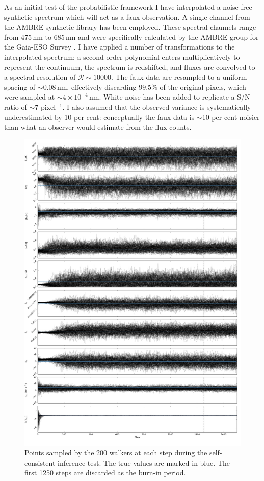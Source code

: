 \documentclass[iop]{emulateapj}
\begin{document}
As an initial test of the probabilistic framework I have interpolated a 
noise-free synthetic spectrum which will act as a faux observation. A single 
channel from the AMBRE synthetic library \citep{ambre} has been employed. These 
spectral channels range from 475\,nm to 685\,nm and were specifically calculated 
by the AMBRE group for the Gaia-ESO Survey \citep{gaia-eso}. I have applied a number of transformations to the 
interpolated spectrum: a second-order polynomial enters multiplicatively to 
represent the continuum, the spectrum is redshifted, and fluxes are convolved 
to a spectral resolution of $\mathcal{R} \sim 10000$. The faux data are resampled 
to a uniform spacing of $\sim{}0.08$\,nm, effectively discarding $99.5\%$ of 
the original pixels, which were sampled at $\sim4\times10^{-4}$\,nm. White noise  
has been added to replicate a S/N ratio of $\sim 7$ pixel$^{-1}$. I also assumed 
that the observed variance is systematically underestimated by 10 per cent: 
conceptually the faux data is $\sim{}$10 per cent noisier than what an observer 
would estimate from the flux counts. 


\begin{figure}
\label{fig:chains}
\includegraphics[height=\textheight]{figures/chains.pdf}
\caption{Points sampled by the 200 walkers at each step during the self-consistent 
inference test. The true values are marked in blue. The first 1250 steps are 
discarded as the burn-in period.}
\end{figure}
\end{document}

